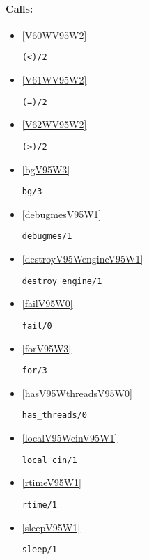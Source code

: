 \paragraph{Calls:} 
\begin{itemize}
\item \ref{V60WV95W2} 
\begin{verbatim}
(<)/2
\end{verbatim}

\item \ref{V61WV95W2} 
\begin{verbatim}
(=)/2
\end{verbatim}

\item \ref{V62WV95W2} 
\begin{verbatim}
(>)/2
\end{verbatim}

\item \ref{bgV95W3} 
\begin{verbatim}
bg/3
\end{verbatim}

\item \ref{debugmesV95W1} 
\begin{verbatim}
debugmes/1
\end{verbatim}

\item \ref{destroyV95WengineV95W1} 
\begin{verbatim}
destroy_engine/1
\end{verbatim}

\item \ref{failV95W0} 
\begin{verbatim}
fail/0
\end{verbatim}

\item \ref{forV95W3} 
\begin{verbatim}
for/3
\end{verbatim}

\item \ref{hasV95WthreadsV95W0} 
\begin{verbatim}
has_threads/0
\end{verbatim}

\item \ref{localV95WcinV95W1} 
\begin{verbatim}
local_cin/1
\end{verbatim}

\item \ref{rtimeV95W1} 
\begin{verbatim}
rtime/1
\end{verbatim}

\item \ref{sleepV95W1} 
\begin{verbatim}
sleep/1
\end{verbatim}

\end{itemize}

